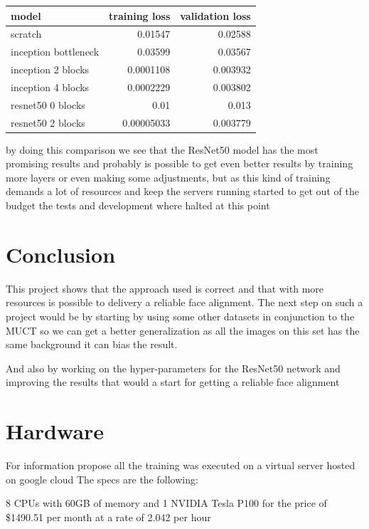 \documentclass[11pt]{article}
\begin{document}
\begin{center}
\begin{tabular}{lrr}
model & training loss & validation loss\\
\hline
scratch & 0.01547 & 0.02588\\
inception bottleneck & 0.03599 & 0.03567\\
inception 2 blocks & 0.0001108 & 0.003932\\
inception 4 blocks & 0.0002229 & 0.003802\\
resnet50 0 blocks & 0.01 & 0.013\\
resnet50 2 blocks & 0.00005033 & 0.003779\\
\end{tabular}
\end{center}

by doing this comparison we see that the ResNet50 model has the most
promising results and probably is possible to get even better results by
training more layers or even making some adjustments, but as this kind of
training demands a lot of resources and keep the servers running started to
get out of the budget the tests and development where halted at this point 

\section{Conclusion}
\label{sec:org1687a99}

This project shows that the approach used is correct and that with more
resources is possible to delivery a reliable face alignment. 
The next step on such a project would be by starting by using some other
datasets in conjunction to the MUCT so we can get a better generalization as
all the images on this set has the same background it can bias the result. 

And also by working on the hyper-parameters for the ResNet50 network and
improving the results that would a start for getting a reliable face alignment 

\section{Hardware}
\label{sec:orgbf2996e}

For information propose all the training was executed on a virtual server
hosted on google cloud
The specs are the following:

8 CPUs with 60GB of memory and 1 NVIDIA Tesla P100 for the price of \$1490.51
per month at a rate of 2.042 per hour













\end{document}
